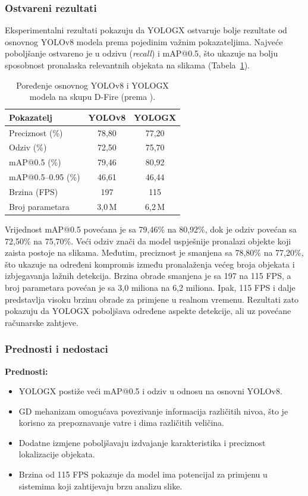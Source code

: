 \subsubsection{Ostvareni rezultati}
Eksperimentalni rezultati pokazuju da YOLOGX ostvaruje bolje rezultate od osnovnog YOLOv8 modela prema pojedinim važnim pokazateljima. Najveće poboljšanje ostvareno je u odzivu (\emph{recall}) i mAP@0.5, što ukazuje na bolju sposobnost pronalaska relevantnih objekata na slikama (Tabela~\ref{tab:yologx}).

\begin{table}[H]
\centering
\small
\begin{tabular}{@{}lcc@{}}
  \toprule
  \textbf{Pokazatelj} & \textbf{YOLOv8} & \textbf{YOLOGX}\\
  \midrule
  Preciznost (\%) & 78,80 & 77,20\\
  Odziv (\%) & 72,50 & 75,70\\
  mAP@0.5 (\%) & 79,46 & 80,92\\
  mAP@0.5--0.95 (\%) & 46,61 & 46,44\\
  Brzina (FPS) & 197 & 115\\
  Broj parametara & 3,0\,M & 6,2\,M\\
  \bottomrule
\end{tabular}
\caption{Poređenje osnovnog YOLOv8 i YOLOGX modela na skupu D-Fire (prema \cite{liyologx}).}
\label{tab:yologx}
\end{table}

Vrijednost mAP@0.5 povećana je sa 79,46\% na 80,92\%, dok je odziv povećan sa 72,50\% na 75,70\%. Veći odziv znači da model uspješnije pronalazi objekte koji zaista postoje na slikama. Međutim, preciznost je smanjena sa 78,80\% na 77,20\%, što ukazuje na određeni kompromis između pronalaženja većeg broja objekata i izbjegavanja lažnih detekcija. Brzina obrade smanjena je sa 197 na 115 FPS, a broj parametara povećan je sa 3,0 miliona na 6,2 miliona. Ipak, 115 FPS i dalje predstavlja visoku brzinu obrade za primjene u realnom vremenu. Rezultati zato pokazuju da YOLOGX poboljšava određene aspekte detekcije, ali uz povećane računarske zahtjeve.

\subsubsection{Prednosti i nedostaci}
\textbf{Prednosti:}
\begin{itemize}
  \item YOLOGX postiže veći mAP@0.5 i odziv u odnosu na osnovni YOLOv8.
  \item GD mehanizam omogućava povezivanje informacija različitih nivoa, što je korisno za prepoznavanje vatre i dima različitih veličina.
  \item Dodatne izmjene poboljšavaju izdvajanje karakteristika i preciznost lokalizacije objekata.
  \item Brzina od 115 FPS pokazuje da model ima potencijal za primjenu u sistemima koji zahtijevaju brzu analizu slike.
\end{itemize}

